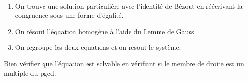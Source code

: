 \begin{remarque}~
    \begin{enumerate}
        \item On trouve une solution particulière avec l'identité de Bézout en réécrivant la congruence sous une forme d'égalité.
        \item On résout l'équation homogène à l'aide du Lemme de Gauss.
        \item On regroupe les deux équations et on résout le système.
    \end{enumerate}
\end{remarque}

\begin{remarque}
Bien vérifier que l'équation est solvable en vérifiant si le membre de droite est un multiple du pgcd.
\end{remarque}

